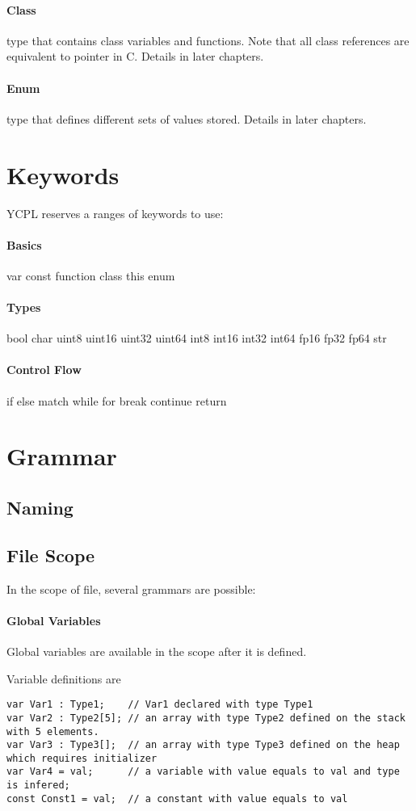 \documentclass[12pt, a4paper]{IEEEtran}
\begin{document}
	\paragraph{Class} type that contains class variables and functions. Note that all class references are equivalent to pointer in C. Details in later chapters.
	\paragraph{Enum} type that defines different sets of values stored. Details in later chapters.

\section{Keywords}
	YCPL reserves a ranges of keywords to use:
	
	\paragraph{Basics} var const function class this enum
	\paragraph{Types} bool char uint8 uint16 uint32 uint64 int8 int16 int32 int64 fp16 fp32 fp64 str
	\paragraph{Control Flow} if else match while for break continue return
	
\section{Grammar}
\subsection{Naming}
\subsection{File Scope}
In the scope of file, several grammars are possible:
\paragraph{Global Variables}
Global variables are available in the scope after it is defined.

Variable definitions are
\begin{lstlisting}
var Var1 : Type1;    // Var1 declared with type Type1
var Var2 : Type2[5]; // an array with type Type2 defined on the stack with 5 elements.
var Var3 : Type3[];  // an array with type Type3 defined on the heap which requires initializer
var Var4 = val;      // a variable with value equals to val and type is infered;
const Const1 = val;  // a constant with value equals to val
\end{lstlisting}
\end{document}
